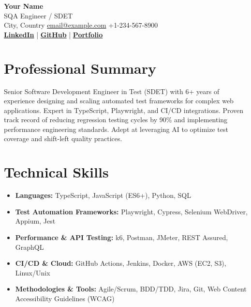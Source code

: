 \documentclass[letterpaper,11pt]{article}
\begin{document}
\begin{center}
    {\Huge \textbf{Your Name}} \\ \vspace{6pt}
    SQA Engineer / SDET \\ \vspace{6pt}
    City, Country \quad \href{mailto:email@example.com}{email@example.com} \quad +1-234-567-8900 \\ \vspace{4pt}
    \href{https://linkedin.com/in/yourprofile}{\textbf{LinkedIn}} \quad | \quad 
    \href{https://github.com/yourprofile}{\textbf{GitHub}} \quad | \quad 
    \href{https://yourportfolio.com}{\textbf{Portfolio}}
\end{center}

\section{Professional Summary}
Senior Software Development Engineer in Test (SDET) with 6+ years of experience designing and scaling automated test frameworks for complex web applications. Expert in TypeScript, Playwright, and CI/CD integrations. Proven track record of reducing regression testing cycles by 90\% and implementing performance engineering standards. Adept at leveraging AI to optimize test coverage and shift-left quality practices.

\section{Technical Skills}
\begin{itemize}[leftmargin=0.15in, label={}, itemsep=6pt]
    \item \textbf{Languages:} TypeScript, JavaScript (ES6+), Python, SQL
    \item \textbf{Test Automation Frameworks:} Playwright, Cypress, Selenium WebDriver, Appium, Jest
    \item \textbf{Performance \& API Testing:} k6, Postman, JMeter, REST Assured, GraphQL
    \item \textbf{CI/CD \& Cloud:} GitHub Actions, Jenkins, Docker, AWS (EC2, S3), Linux/Unix
    \item \textbf{Methodologies \& Tools:} Agile/Scrum, BDD/TDD, Jira, Git, Web Content Accessibility Guidelines (WCAG)
\end{itemize}

\end{document}
